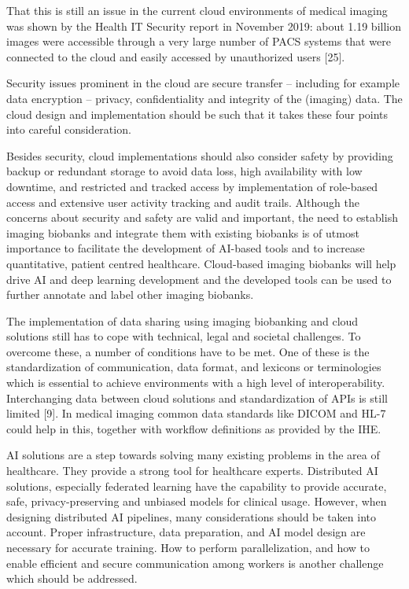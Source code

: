 That this is still an issue in the current cloud environments of medical imaging was shown by the Health IT Security report in November 2019: about 1.19 billion images were accessible through a very large number of PACS systems that were connected to the cloud and easily accessed by unauthorized users [25].


Security issues prominent in the cloud are secure transfer – including for example data encryption – privacy, confidentiality and integrity of the (imaging) data. The cloud design and implementation should be such that it takes these four points into careful consideration.


Besides security, cloud implementations should also consider safety by providing backup or redundant storage to avoid data loss, high availability with low downtime, and restricted and tracked access by implementation of role-based access and extensive user activity tracking and audit trails.
Although the concerns about security and safety are valid and important, the need to establish imaging biobanks and integrate them with existing biobanks is of utmost importance to facilitate the development of AI-based tools and to increase quantitative, patient centred healthcare. Cloud-based imaging biobanks will help drive AI and deep learning development and the developed tools can be used to further annotate and label other imaging biobanks.

 
The implementation of data sharing using imaging biobanking and cloud solutions still has to cope with technical, legal and societal challenges. To overcome these, a number of conditions have to be met. One of these is 
the standardization of communication, data format, and lexicons or terminologies which is essential to achieve environments with a high level of interoperability. Interchanging data between cloud solutions and standardization of APIs is still limited [9]. In medical imaging common data standards like DICOM and HL-7 could help in this, together with workflow definitions as provided by the IHE.

AI solutions are a step towards solving many existing problems in the area of healthcare. They provide a strong tool for healthcare experts. Distributed AI solutions, especially federated learning have the capability to provide accurate, safe, privacy-preserving and unbiased models for clinical usage. However, when designing distributed AI pipelines, many considerations should be taken into account. Proper infrastructure, data preparation, and AI model design are necessary for accurate training. How to perform parallelization, and how to enable efficient and secure communication among workers is another challenge which should be addressed.

